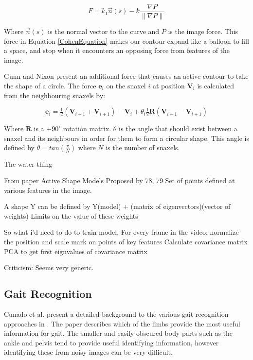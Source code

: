 \begin{equation}
	F = k_1 \vec{n}(s) - k\frac{\nabla P}{\|\nabla P\|}
	\label{CohenEquation}
\end{equation}

Where $\vec{n}(s)$ is the normal vector to the curve and $P$ is the image force.
This force in Equation \ref{CohenEquation} makes our contour expand like a balloon to fill a space, and stop when it encounters an opposing force from features of the image.

Gunn and Nixon present an additional force \cite{GunnSnake} that causes an active contour to take the shape of a circle.
The force $\mathbf{e}_i$ on the snaxel $i$ at position $\mathbf{V}_i$ is calculated from the neighbouring snaxels by:

\begin{equation}
	\mathbf{e}_i = \tfrac{1}{2}(\mathbf{V}_{i-1} + \mathbf{V}_{i+1}) - \mathbf{V}_i + \theta_i\tfrac{1}{2}\mathbf{R}(\mathbf{V}_{i-1} - \mathbf{V}_{i+1})
\end{equation}

Where $\mathbf{R}$ is a $+90^\circ$ rotation matrix.
$\theta$ is the angle that should exist between a snaxel and its neighbours in order for them to form a circular shape.
This angle is defined by $\theta = tan(\frac{\pi}{N})$ where $N$ is the number of snaxels.

The water thing

From paper \cite{ImageSegModels}
Active Shape Models  Proposed by 78, 79
Set of points defined at various features in the image.

A shape Y can be defined by Y(model) + (matrix of eigenvectors)(vector of weights)
Limits on the value of these weights

So what i'd need to do to train model:
For every frame in the video:
  normalize the position and scale
  mark on points of key features
Calculate covariance matrix
PCA to get first eignvalues of covariance matrix

Criticism:
Seems very generic.

\subsection{Gait Recognition}

Cunado et al. present a detailed background to the various gait recognition approaches in \cite{GaitModels}.
The paper describes which of the limbs provide the most useful information for gait.
The smaller and easily obscured body parts such as the ankle and pelvis tend to provide useful identifying information, however identifying these from noisy images can be very difficult.

